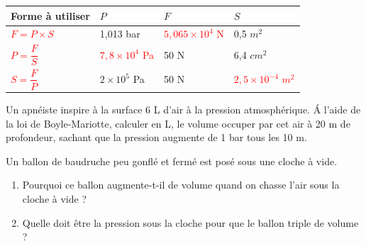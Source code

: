\documentclass[11pt,a4paper]{article}
\newcommand{\cadreblanc}[1]{%
\medskip\framebox[\linewidth][c]{%
\rule{0mm}{#1mm}}\par
\medskip}
\renewcommand{\arraystretch}{2}
\begin{document}
\begin{fleche}
\begin{tabular}{|C{0.5cm} p{5.5cm}|C{3cm}|C{3cm}|C{3cm}|}
         
        
    \end{tabular}


\newpage


\begin{center}

    \renewcommand{\arraystretch}{3}


    \begin{tabular}{|p{6cm}|C{2cm}|C{2cm}|C{2cm}|}
         \hline
      Forme à utiliser & $P$ & $F$ & $S$ \\
         \hline
         \textcolor{red}{$F = P \times S$} & 1,013 bar  & \textcolor{red}{$5{,}065 \times 10^4$ N} & 0,5 $m^2$\\
         \hline
         \textcolor{red}{$P = \dfrac{F}{S}$} & \textcolor{red}{$7{,}8 \times 10^4$ Pa} & 50 N & 6,4 $cm^2$ \\
         \hline
         \textcolor{red}{$S = \dfrac{F}{P}$} & $2 \times 10^5$ Pa & 50 N & \textcolor{red}{$2{,}5 \times 10^{-4}$ $m^2$} \\
         \hline


    \end{tabular}\end{center}

    \vfill 



\vspace{-3mm}

\noindent%
\begin{minipage}{.36\textwidth}%
Un apnéiste inspire à la surface 6 L d'air à la pression atmosphérique. \'A l'aide de la loi de Boyle-Mariotte, calculer en L, le volume occuper par cet air à 20 m de profondeur, sachant que la pression augmente de 1 bar tous les 10 m.  

\end{minipage}%
\hfill
\begin{minipage}{.53\textwidth}%
\cadreblanc{40}
\end{minipage}%

\vfill 

\vfill 



Un ballon de baudruche peu gonflé et fermé est posé sous une cloche à vide. 

\begin{enumerate}
    \item Pourquoi ce ballon augmente-t-il de volume quand on chasse l'air sous la cloche à vide ? \\[2mm]
    \cadreblanc{15}
    \item Quelle doit être la pression sous la cloche pour que le ballon triple de volume ? \\[2mm]
    \cadreblanc{20}
\end{enumerate}


\vfill 
\end{fleche}
\end{document}
